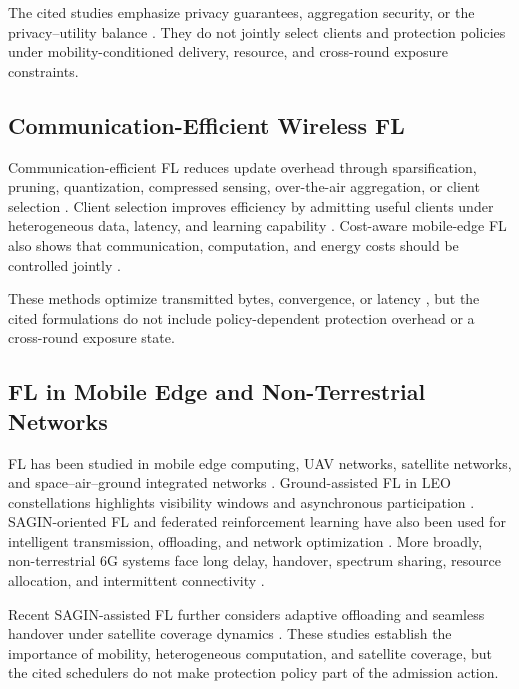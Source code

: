 \documentclass[preprint,12pt]{elsarticle}
\begin{document}
The cited studies emphasize privacy guarantees, aggregation security, or the privacy--utility balance \cite{wei2023pfl_dp,yuan2023amplitude,zhao2025federation}. They do not jointly select clients and protection policies under mobility-conditioned delivery, resource, and cross-round exposure constraints.

\subsection{Communication-Efficient Wireless FL}

Communication-efficient FL reduces update overhead through sparsification, pruning, quantization, compressed sensing, over-the-air aggregation, or client selection \cite{oh2023fedqcs,oh2024fedvqcs,liu2023adaptivequant,kim2023beamforming}. Client selection improves efficiency by admitting useful clients under heterogeneous data, latency, and learning capability \cite{oort2021oort,chen2024clientselection,dong2024aoi}. Cost-aware mobile-edge FL also shows that communication, computation, and energy costs should be controlled jointly \cite{luo2021costeffective}.

These methods optimize transmitted bytes, convergence, or latency \cite{oh2023fedqcs,liu2023adaptivequant,chen2024clientselection}, but the cited formulations do not include policy-dependent protection overhead or a cross-round exposure state.

\subsection{FL in Mobile Edge and Non-Terrestrial Networks}

FL has been studied in mobile edge computing, UAV networks, satellite networks, and space--air--ground integrated networks \cite{razmi2022ground,tang2023flsagin,qin2024dfrl}. Ground-assisted FL in LEO constellations highlights visibility windows and asynchronous participation \cite{razmi2022ground}. SAGIN-oriented FL and federated reinforcement learning have also been used for intelligent transmission, offloading, and network optimization \cite{tang2023flsagin,qin2024dfrl}. More broadly, non-terrestrial 6G systems face long delay, handover, spectrum sharing, resource allocation, and intermittent connectivity \cite{mahboob2024ntn,liu2018sagin}.

Recent SAGIN-assisted FL further considers adaptive offloading and seamless handover under satellite coverage dynamics \cite{han2024orchestrating}. These studies establish the importance of mobility, heterogeneous computation, and satellite coverage, but the cited schedulers do not make protection policy part of the admission action.
\end{document}
